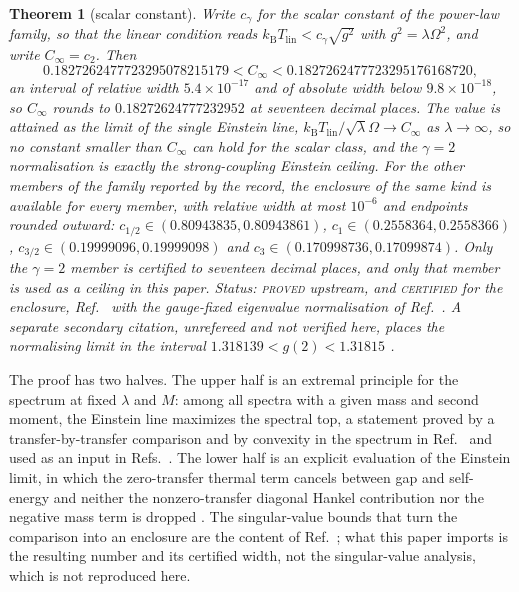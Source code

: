 \documentclass[aps,10pt,superscriptaddress,floatfix,amsmath,amssymb,nofootinbib]{revtex4-2}
\newcommand{\kb}{k_{\mathrm B}}
\newcommand{\Tlin}{T_{\mathrm{lin}}}
\newcommand{\Cinf}{C_\infty}
\newcommand{\PROVED}{\textsc{proved}}
\newcommand{\CERT}{\textsc{certified}}
\newtheorem{theorem}{Theorem}
\begin{document}
\begin{theorem}[scalar constant]\label{thm:scalar}
Write $c_\gamma$ for the scalar constant of the power-law family, so that the linear
condition reads $\kb\Tlin<c_\gamma\sqrt{g^{2}}$ with $g^{2}=\lambda\Omega^{2}$, and write
$\Cinf=c_{2}$. Then
\begin{equation}\label{eq:cinf}
0.1827262477723295078215179<\Cinf<0.1827262477723295176168720,
\end{equation}
an interval of relative width $5.4\times10^{-17}$ and of absolute width below
$9.8\times10^{-18}$, so $\Cinf$ rounds to $0.18272624777232952$ at seventeen decimal places.
The value is attained as the limit of the single Einstein line,
$\kb\Tlin/\sqrt{\lambda}\Omega\to\Cinf$ as $\lambda\to\infty$, so no constant smaller than
$\Cinf$ can hold for the scalar class, and the $\gamma=2$ normalisation is exactly the
strong-coupling Einstein ceiling. For the other members of the family reported by the
record, the enclosure of the same kind is available for every member, with relative width at
most $10^{-6}$ and endpoints rounded outward:
$c_{1/2}\in(0.80943835,0.80943861)$, $c_{1}\in(0.2558364,0.2558366)$,
$c_{3/2}\in(0.19999096,0.19999098)$ and $c_{3}\in(0.170998736,0.17099874)$. Only the
$\gamma=2$ member is certified to seventeen decimal places, and only that member is used as
a ceiling in this paper.
Status: \PROVED{} upstream, and \CERT{} for the enclosure, Ref.~\cite{gamma} with the
gauge-fixed eigenvalue normalisation of Ref.~\cite{finiteband}. A separate secondary
citation, unrefereed and not verified here, places the normalising limit in the interval
$1.318139<g(2)<1.31815$ \cite{kondratev}.
\end{theorem}

The proof has two halves. The upper half is an extremal principle for the spectrum at fixed
$\lambda$ and $M$: among all spectra with a given mass and second moment, the Einstein line
maximizes the spectral top, a statement proved by a transfer-by-transfer comparison and by
convexity in the spectrum in Ref.~\cite{rens} and used as an input in
Refs.~\cite{cutoff,gamma}. The lower half is an explicit evaluation of the Einstein limit,
in which the zero-transfer thermal term cancels between gap and self-energy and neither the
nonzero-transfer diagonal Hankel contribution nor the negative mass term is dropped
\cite{gamma}. The singular-value bounds that turn the comparison into an enclosure are the
content of Ref.~\cite{gamma}; what this paper imports is the resulting number and its
certified width, not the singular-value analysis, which is not reproduced here.
\end{document}
